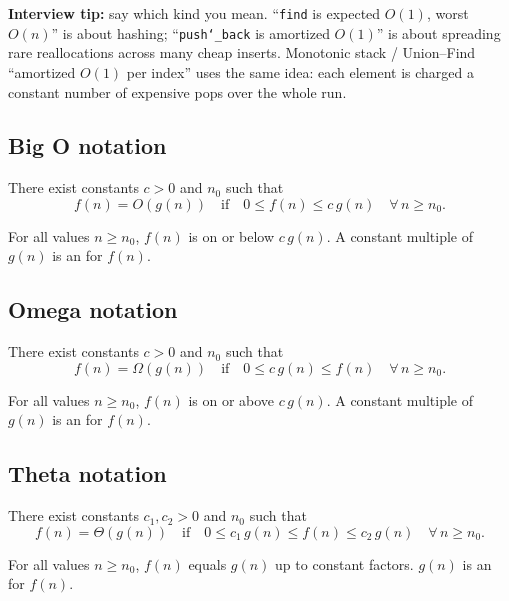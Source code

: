 \par\noindent\textbf{Interview tip:} say which kind you mean.
``\texttt{find} is expected $O(1)$, worst $O(n)$'' is about hashing;
``\texttt{push\char`_back} is amortized $O(1)$'' is about spreading rare
reallocations across many cheap inserts. Monotonic stack / Union--Find
``amortized $O(1)$ per index'' uses the same idea: each element is charged
a constant number of expensive pops over the whole run.

\newpage
\subsection{Big O notation}
There exist constants $c > 0$ and $n_0$ such that
\begin{equation}
    \label{eqn:bigOnotation}
    f(n) = O(g(n)) \quad \text{if} \quad 0 \le f(n) \le c\, g(n)
    \quad \forall\, n \ge n_0 .
\end{equation}

For all values $n \ge n_0$, $f(n)$ is on or below $c\, g(n)$.
\newline
A constant multiple of $g(n)$ is an  for $f(n)$.

\subsection{Omega notation}
There exist constants $c > 0$ and $n_0$ such that
\begin{equation}
    \label{eqn:omeganotation}
    f(n) = \Omega(g(n)) \quad \text{if} \quad 0 \le c\, g(n) \le f(n)
    \quad \forall\, n \ge n_0 .
\end{equation}

For all values $n \ge n_0$, $f(n)$ is on or above $c\, g(n)$.
\newline
A constant multiple of $g(n)$ is an  for $f(n)$.

\subsection{Theta notation}
There exist constants $c_1, c_2 > 0$ and $n_0$ such that
\begin{equation}
    \label{eqn:thetanotation}
    f(n) = \Theta(g(n)) \quad \text{if} \quad
    0 \le c_1\, g(n) \le f(n) \le c_2\, g(n)
    \quad \forall\, n \ge n_0 .
\end{equation}
 
For all values $n \ge n_0$, $f(n)$ equals $g(n)$ up to constant factors.
\newline
$g(n)$ is an  for $f(n)$.


